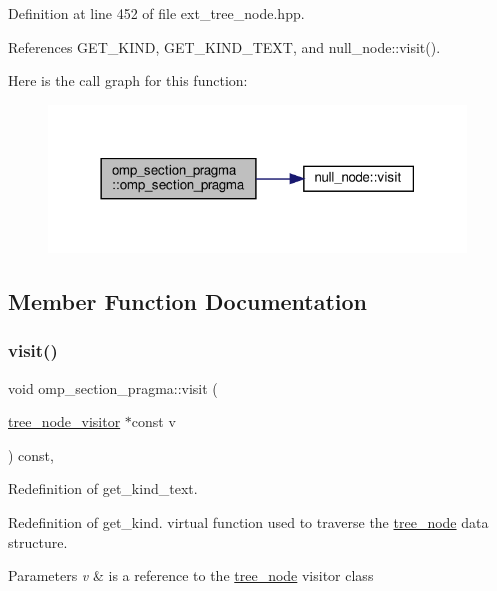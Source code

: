 Definition at line 452 of file ext\+\_\+tree\+\_\+node.\+hpp.



References G\+E\+T\+\_\+\+K\+I\+ND, G\+E\+T\+\_\+\+K\+I\+N\+D\+\_\+\+T\+E\+XT, and null\+\_\+node\+::visit().

Here is the call graph for this function\+:
\nopagebreak
\begin{figure}[H]
\begin{center}
\leavevmode
\includegraphics[width=314pt]{d9/d69/structomp__section__pragma_a9018c5bd02b901872ff552d51e58527d_cgraph}
\end{center}
\end{figure}


\subsection{Member Function Documentation}
\mbox{\label{structomp__section__pragma_af4ab9f80608c36b26779495aacc05e43}} 
\subsubsection{\texorpdfstring{visit()}{visit()}}
{\footnotesize\ttfamily void omp\+\_\+section\+\_\+pragma\+::visit (\begin{DoxyParamCaption}\item[{\hyperlink{classtree__node__visitor}{tree\+\_\+node\+\_\+visitor} $\ast$const}]{v }\end{DoxyParamCaption}) const\hspace{0.3cm}{\ttfamily [override]}, {\ttfamily [virtual]}}



Redefinition of get\+\_\+kind\+\_\+text. 

Redefinition of get\+\_\+kind. virtual function used to traverse the \hyperlink{classtree__node}{tree\+\_\+node} data structure. 
\begin{DoxyParams}{Parameters}
{\em v} & is a reference to the \hyperlink{classtree__node}{tree\+\_\+node} visitor class \\
\hline
\end{DoxyParams}


